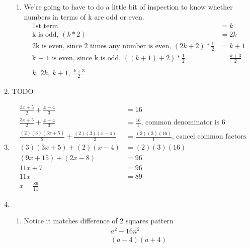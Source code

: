 \documentclass[11pt]{article}
\begin{document}
\begin{enumerate}
\begin{enumerate}
            \item
                We're going to have to do a little bit of inspection to know whether numbers in terms of k are odd or even.
                \begin{equation*}
                    \begin{split}
                        \text{1st term}&=k\\
                        \text{k is odd, }(k*2)&=2k\\
                        \text{2k is even, since 2 times any number is even, }(2k+2)*\frac{1}{2}&=k+1\\
                        \text{k + 1 is even, since k is odd, }((k+1)+2)*\frac{1}{2}&=\frac{k+3}{2}\\
                        \\
                        k,\ 2k,\ k+1,\ \frac{k+3}{2}
                    \end{split}
                \end{equation*}
                
        \end{enumerate}

    \pagebreak
    \item
        TODO

    \pagebreak
    \item
        \begin{equation*}
            \begin{split}
                \frac{3x+5}{2}+\frac{x-4}{3}&=16\\
                \frac{3x+5}{2}+\frac{x-4}{3}&=\frac{16}{1}\text{, common denominator is 6}\\
                \frac{(2)(3)(3x+5)}{2}+\frac{(2)(3)(x-4)}{3}&=\frac{(2)(3)(16)}{1}\text{, cancel common factors}\\
                (3)(3x+5)+(2)(x-4)&=(2)(3)(16)\\
                (9x+15)+(2x-8)&=96\\
                11x+7&=96\\
                11x&=89\\
                x=\frac{89}{11}
            \end{split}
        \end{equation*}

    \pagebreak
    \item
        \begin{enumerate}
            \item Notice it matches difference of 2 squares pattern
                \begin{equation*}
                    \begin{split}
                        a^2-16n^2\\
                        (a-4)(a+4)
                    \end{split}
                \end{equation*}


\end{enumerate}
\end{enumerate}
\end{document}
